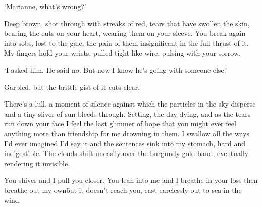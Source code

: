 `Marianne, what's wrong?'

Deep brown, shot through with streaks of red, tears that have swollen
the skin, bearing the cuts on your heart, wearing them on your
sleeve. You break again into sobs, lost to the gale, the pain of them
insignificant in the full thrust of it. My fingers hold your wrists,
pulled tight like wire, pulsing with your sorrow.

`I asked him. He said no. But now I know he's going with someone else.'

Garbled, but the brittle gist of it cuts clear.

There's a lull, a moment of silence against which the particles in the
sky disperse and a tiny sliver of sun bleeds through. Setting, the day
dying, and as the tears run down your face I feel the last glimmer of
hope that you might ever feel anything more than friendship for me
drowning in them. I swallow all the ways I'd ever imagined I'd say it
and the sentences sink into my stomach, hard and indigestible. The
clouds shift uneasily over the burgundy gold band, eventually
rendering it invisible.

You shiver and I pull you closer. You lean into me and I breathe in
your loss then breathe out my own\=but it doesn't reach you, cast
carelessly out to sea in the wind.


